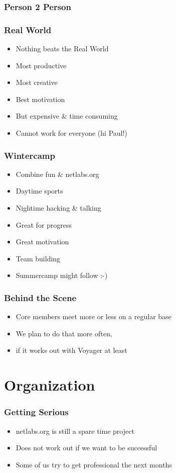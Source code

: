 \documentclass{beamer}
\begin{document}
\subsubsection{Person 2 Person}

\begin{frame}
\frametitle{Real World}
\begin{itemize}
  \item Nothing beats the Real World\texttrademark
  \item Most productive
  \item Most creative
  \item Best motivation
  \item But expensive \& time consuming
  \item Cannot work for everyone (hi Paul!)
\end{itemize}
\end{frame}

\begin{frame}
\frametitle{Wintercamp}
\begin{itemize}
  \item Combine fun \& netlabs.org
  \item Daytime sports
  \item Nightime hacking \& talking
  \item Great for progress
  \item Great motivation
  \item Team building
  \item Summercamp might follow :-)
\end{itemize}
\end{frame}

\begin{frame}
\frametitle{Behind the Scene}
\begin{itemize}
  \item Core members meet more or less on a regular base
  \item We plan to do that more often,
  \item if it works out with Voyager at least 
\end{itemize}
\end{frame}

\section{Organization}

\begin{frame}
\frametitle{Getting Serious}
\begin{itemize}
  \item netlabs.org is still a spare time project
  \item Does not work out if we want to be successful
  \item Some of us try to get professional the next months
\end{itemize}
\end{frame}
\end{document}
